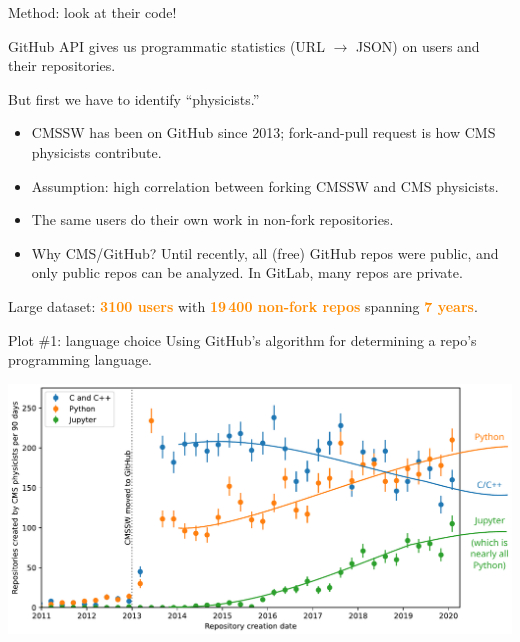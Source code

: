 \documentclass[aspectratio=169]{beamer}
\begin{document}
\begin{frame}{Method: look at their code!}
\Large

\vspace{0.5 cm}
GitHub API gives us programmatic statistics (URL $\to$ JSON) on users and their repositories.

\vspace{0.5 cm}
But first we have to identify ``physicists.''
\large

\vspace{0.5 cm}
\begin{itemize}
\item CMSSW has been on GitHub since 2013; fork-and-pull request is how CMS physicists contribute.
\item Assumption: high correlation between forking CMSSW and CMS physicists.
\item The same users do their own work in non-fork repositories.
\item Why CMS/GitHub? Until recently, all (free) GitHub repos were public, and only public repos can be analyzed. In GitLab, many repos are private.
\end{itemize}

\vspace{0.25 cm}
Large dataset: \textcolor{darkorange}{\bf 3100 users} with \textcolor{darkorange}{\bf 19\,400 non-fork repos} spanning \textcolor{darkorange}{\bf 7 years}.
\end{frame}

\begin{frame}{Plot \#1: language choice}
\vspace{0.25 cm}
Using GitHub's algorithm for determining a repo's programming language.

\vspace{0.15 cm}
\includegraphics[width=\linewidth]{01-github-cmssw-language.pdf}
\end{frame}
\end{document}
